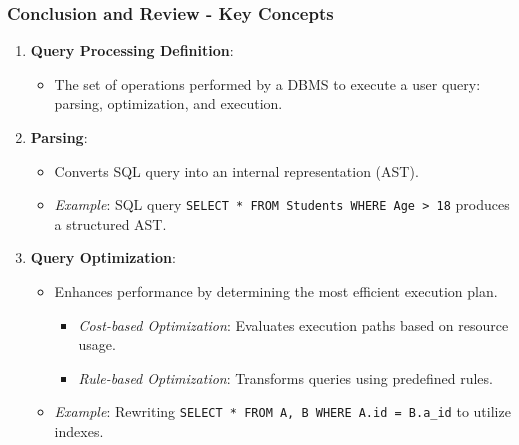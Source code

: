 \documentclass[aspectratio=169]{beamer}
\begin{document}
\begin{frame}[fragile]
    \frametitle{Conclusion and Review - Key Concepts}
    \begin{enumerate}
        \item \textbf{Query Processing Definition}:
        \begin{itemize}
            \item The set of operations performed by a DBMS to execute a user query: parsing, optimization, and execution.
        \end{itemize}

        \item \textbf{Parsing}:
        \begin{itemize}
            \item Converts SQL query into an internal representation (AST).
            \item \textit{Example}: SQL query \texttt{SELECT * FROM Students WHERE Age > 18} produces a structured AST.
        \end{itemize}

        \item \textbf{Query Optimization}:
        \begin{itemize}
            \item Enhances performance by determining the most efficient execution plan.
            \begin{itemize}
                \item \textit{Cost-based Optimization}: Evaluates execution paths based on resource usage.
                \item \textit{Rule-based Optimization}: Transforms queries using predefined rules.
            \end{itemize}
            \item \textit{Example}: Rewriting \texttt{SELECT * FROM A, B WHERE A.id = B.a_id} to utilize indexes.
        \end{itemize}
    \end{enumerate}
\end{frame}
\end{document}

